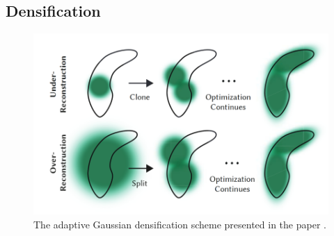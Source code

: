 \subsection{Densification}
\begin{figure}
    \centering
    \includegraphics[width=\linewidth]{images/densification.png}
    \caption{The adaptive Gaussian densification scheme presented in the paper \cite[Fig. 4]{kerbl3DGaussianSplatting2023}.}
\end{figure}

